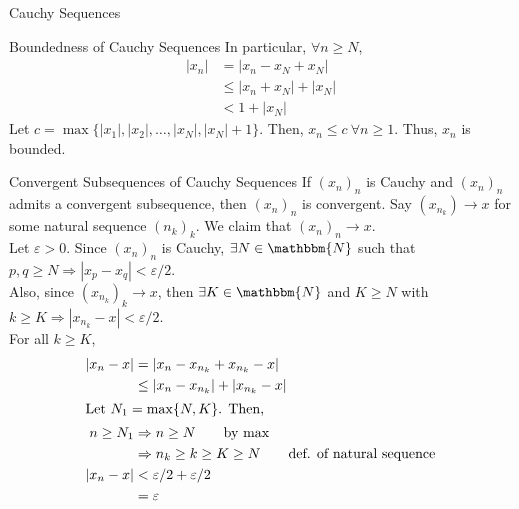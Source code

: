 \documentclass[10pt]{extarticle}
\newcommand{\N}{\mathbbm{N}}
\begin{document}
\begin{problem}{Cauchy Sequences}
\begin{problem}{Boundedness of Cauchy Sequences}
      In particular, $\forall n\geq N$,
      \begin{align*}
        |x_n| &= |x_n - x_N + x_N|\\
              &\leq |x_n + x_N| + |x_N| \tag*{Triangle Inequality}\\
              &< 1 + |x_N|
      \end{align*}
      Let $c = \max\{|x_1|,|x_2|,\dots,|x_N|,|x_N|+1\}$. Then, $x_n \leq c~\forall n\geq 1$. Thus, $x_n$ is bounded.
    \end{problem}
    \begin{problem}{Convergent Subsequences of Cauchy Sequences}
      If $(x_n)_n$ is Cauchy and $(x_n)_n$ admits a convergent subsequence, then $(x_n)_n$ is convergent.
      \tcblower
      Say $(x_{n_k})\rightarrow x$ for some natural sequence $(n_k)_k$. We claim that $(x_n)_n\rightarrow x$.\\

      Let $\varepsilon > 0$. Since $(x_n)_n$ is Cauchy, $\exists N\in\N$ such that $p,q\geq N \Rightarrow |x_p-x_q| < \varepsilon/2$.\\

      Also, since $(x_{n_k})_k \rightarrow x$, then $\exists K\in\N$ and $K\geq N$ with $k\geq K \Rightarrow |x_{n_k} - x| < \varepsilon/2$.\\

      For all $k\geq K$,
      \begin{align*}
        |x_n - x| &= |x_n - x_{n_k} + x_{n_k} - x|\\
                  &\leq |x_n - x_{n_k}| + |x_{n_k} - x|\\
        \shortintertext{Let $N_1 = \max\{N,K\}$. Then,}
        n \geq N_1 &\Rightarrow n\geq N \tag*{by $\max$}\\
                   &\Rightarrow n_k \geq k \geq K \geq N \tag*{def. of natural sequence}\\
        |x_n - x| &< \varepsilon/2 + \varepsilon/2\\
                  &= \varepsilon
      \end{align*}
    \end{problem}
  \end{problem}
\end{document}
